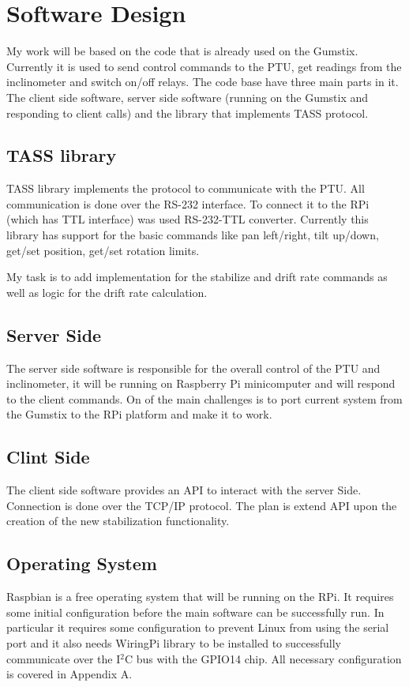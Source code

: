 \section{Software Design}
My work will be based on the code that is already used on the Gumstix. Currently it is used to send control commands to the PTU, get readings from the inclinometer and switch on/off relays. The code base have three main parts in it. The client side software, server side software (running on the Gumstix and responding to client calls) and the library that implements TASS protocol. 

\subsection{TASS library}
TASS library implements the protocol to communicate with the PTU. All communication is done over the RS-232 interface. To connect it to the RPi (which has TTL interface) was used RS-232-TTL converter. Currently this library has support for the basic commands like pan left/right, tilt up/down, get/set position, get/set rotation limits.

My task is to add implementation for the stabilize and drift rate commands as well as logic for the drift rate calculation.

\subsection{Server Side}
The server side software is responsible for the overall control of the PTU and inclinometer, it will be running on Raspberry Pi minicomputer and will respond to the client commands. On of the main challenges is to port current system from the Gumstix to the RPi platform and make it to work.

\subsection{Clint Side}
The client side software provides an API to interact with the server Side. Connection is done over the TCP/IP protocol. The plan is extend API upon the creation of the new stabilization functionality. 

\subsection{Operating System}
Raspbian is a free operating system that will be running on the RPi. It requires some initial configuration before the main software can be successfully run. In particular it requires some configuration to prevent Linux from using the serial port and it also needs WiringPi library \cite{WiringPi} to be installed to successfully communicate over the I$^2$C bus with the GPIO14 chip. All necessary configuration is covered in Appendix A.  

